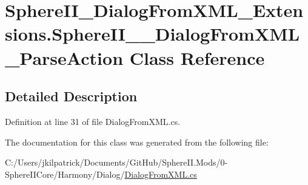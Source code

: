 \hypertarget{class_sphere_i_i___dialog_from_x_m_l___extensions_1_1_sphere_i_i_____dialog_from_x_m_l___parse_action}{}\section{Sphere\+I\+I\+\_\+\+Dialog\+From\+X\+M\+L\+\_\+\+Extensions.\+Sphere\+I\+I\+\_\+\+\_\+\+Dialog\+From\+X\+M\+L\+\_\+\+Parse\+Action Class Reference}
\label{class_sphere_i_i___dialog_from_x_m_l___extensions_1_1_sphere_i_i_____dialog_from_x_m_l___parse_action}


\subsection{Detailed Description}


Definition at line 31 of file Dialog\+From\+X\+M\+L.\+cs.



The documentation for this class was generated from the following file\+:\begin{DoxyCompactItemize}
\item 
C\+:/\+Users/jkilpatrick/\+Documents/\+Git\+Hub/\+Sphere\+I\+I.\+Mods/0-\/\+Sphere\+I\+I\+Core/\+Harmony/\+Dialog/\mbox{\hyperlink{_dialog_from_x_m_l_8cs}{Dialog\+From\+X\+M\+L.\+cs}}\end{DoxyCompactItemize}
